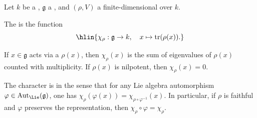 \begin{definition} \label{definition:character_of_a_lie_algebra_representation_over_a_field}

    Let $k$ be a , $\mathfrak{g}$ a , and $(\rho, V)$ a finite-dimensional  over $k$.

    The  is the function
    $$\hlin{\chi_\rho : \mathfrak{g} \to k, \quad x \mapsto \mathrm{tr}(\rho(x)).}$$

    If $x \in \mathfrak{g}$ acts via a  $\rho(x)$, then $\chi_\rho(x)$ is the sum of eigenvalues of $\rho(x)$ counted with multiplicity. If $\rho(x)$ is nilpotent, then $\chi_\rho(x) = 0$.

    The character is  in the sense that for any Lie algebra automorphism $\varphi \in \mathrm{Aut}_{\Lie}(\mathfrak{g})$, one has $\chi_\rho(\varphi(x)) = \chi_{\rho \circ \varphi^{-1}}(x)$. In particular, if $\rho$ is faithful and $\varphi$ preserves the representation, then $\chi_\rho \circ \varphi = \chi_\rho$.
\end{definition}
